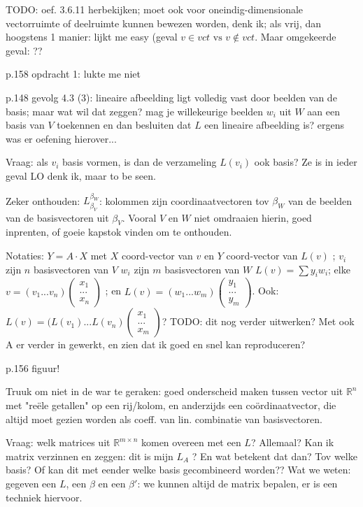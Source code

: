 \documentclass{article}
\begin{document}
TODO: oef. 3.6.11 herbekijken; moet ook voor oneindig-dimensionale vectorruimte of deelruimte kunnen bewezen worden, denk ik; 
als vrij, dan hoogstens 1 manier: lijkt me easy (geval $v \in vct \text{ vs } v \notin vct$. 
Maar omgekeerde geval: ?? 

p.158 opdracht 1: lukte me niet 

p.148 gevolg 4.3 (3): lineaire afbeelding ligt volledig vast door beelden van de basis; maar wat wil dat zeggen? mag je willekeurige beelden $w_i$ uit $W$ aan een basis van $V$ toekennen en dan 
besluiten dat $L$ een lineaire afbeelding is? ergens was er oefening hierover... 

Vraag: als $v_i$ basis vormen, is dan de verzameling $L(v_i)$ ook basis? Ze is in ieder geval LO denk ik, maar to be seen. 

Zeker onthouden: $L_{\beta_V}^{\beta_W}$: kolommen zijn coordinaatvectoren tov $\beta_W$ van de beelden van de basisvectoren uit $\beta_V$. Vooral $V$ en $W$ niet omdraaien hierin, goed inprenten, of goeie kapstok vinden om te onthouden. 

Notaties: $Y = A \cdot X$ met $X$ coord-vector van $v$ en $Y$ coord-vector van $L(v)$ ; 
$v_i$ zijn $n$ basisvectoren van $V$
$w_i$ zijn $m$ basisvectoren van $W$ 
$L(v) = \sum y_i w_i$; 
elke $v = (v_1 ... v_n) \begin{pmatrix} x_1 \\ ... \\x_n \end{pmatrix}$ ; en $L(v) = (w_1 ... w_m) \begin{pmatrix} y_1 \\ ... \\y_m \end{pmatrix}$. 
Ook: $L(v) = ( L(v_1) ... L(v_n) \begin{pmatrix} x_1 \\ ... \\x_m \end{pmatrix}$? 
TODO: dit nog verder uitwerken? Met ook A er verder in gewerkt, en zien dat ik goed en snel kan reproduceren? 

p.156 figuur! 

Truuk om niet in de war te geraken: goed onderscheid maken tussen vector uit $\mathbb{R}^n$ met "re\"ele getallen" op een rij/kolom, en anderzijds een co\"ordinaatvector, die altijd moet gezien worden als coeff. van lin. combinatie van basisvectoren. 

Vraag: welk matrices uit $\mathbb{R}^{m \times n} $ komen overeen met een $L$? Allemaal? Kan ik matrix verzinnen en zeggen: dit is mijn $L_A$ ? En wat betekent dat dan? Tov welke basis? Of kan dit met eender welke basis gecombineerd worden?? 
Wat we weten: gegeven een $L$, een $\beta$ en een $\beta'$: we kunnen altijd de matrix bepalen, er is een techniek hiervoor. 
\end{document}
